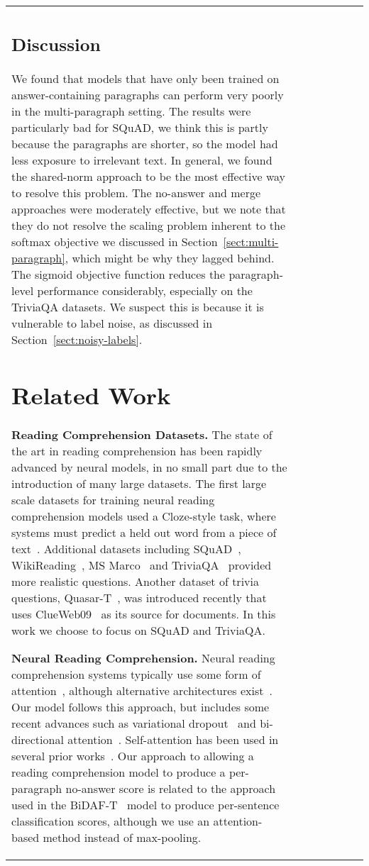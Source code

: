 \documentclass[11pt,a4paper]{article}
\begin{document}
\begin{table*}
\begin{small}
\begin{center}
\begin{tabular}{ | l | l | l | c | l | l | c |}
\subsection{Discussion}
We found that models that have only been trained on answer-containing paragraphs can perform very poorly in the multi-paragraph setting. The results were particularly bad for SQuAD, we think this is partly because the paragraphs are shorter, so the model had less exposure to irrelevant text. In general, we found the shared-norm approach to be the most effective way to resolve this problem. 
The no-answer and merge approaches were moderately effective, but we note that they do not resolve the scaling problem inherent to the softmax objective we discussed in Section~\ref{sect:multi-paragraph}, which might be why they lagged behind. 
The sigmoid objective function reduces the paragraph-level performance considerably, especially on the TriviaQA datasets. We suspect this is because it is vulnerable to label noise, as discussed in Section~\ref{sect:noisy-labels}.

\section{Related Work}
\textbf{Reading Comprehension Datasets.} The state of the art in reading comprehension has been rapidly advanced by neural models, in no small part due to the introduction of many large datasets. The first large scale datasets for training neural reading comprehension models used a Cloze-style task, where systems must predict a held out word from a piece of text~\cite{hermann2015teaching, hill2015goldilocks}. Additional datasets including SQuAD~\cite{squad}, WikiReading~\cite{hewlett2016wikireading}, MS Marco~\cite{nguyen2016ms} and TriviaQA~\cite{triviaqa} provided more realistic questions. Another dataset of trivia questions, Quasar-T~\cite{dhingra2017quasar}, was introduced recently that uses ClueWeb09~\cite{callan2009clueweb09} as its source for documents. In this work we choose to focus on SQuAD and TriviaQA.

\textbf{Neural Reading Comprehension.} 
Neural reading comprehension systems typically use some form of attention~\citep{wang2016machine}, although alternative architectures exist~\cite{openqa, weissenborn2017fastqa}. Our model follows this approach, but includes some recent advances such as variational dropout~\cite{variational_dropout} and bi-directional attention~\cite{bidaf}. Self-attention has been used in several prior works~\cite{cheng2016long, wang2017gated, pan2017memen}. Our approach to allowing a reading comprehension model to produce a per-paragraph no-answer score is related to the approach used in the BiDAF-T~\cite{min2017question} model to produce per-sentence classification scores, although we use an attention-based method instead of max-pooling.


\end{tabular}
\end{center}
\end{small}
\end{table*}
\end{document}
